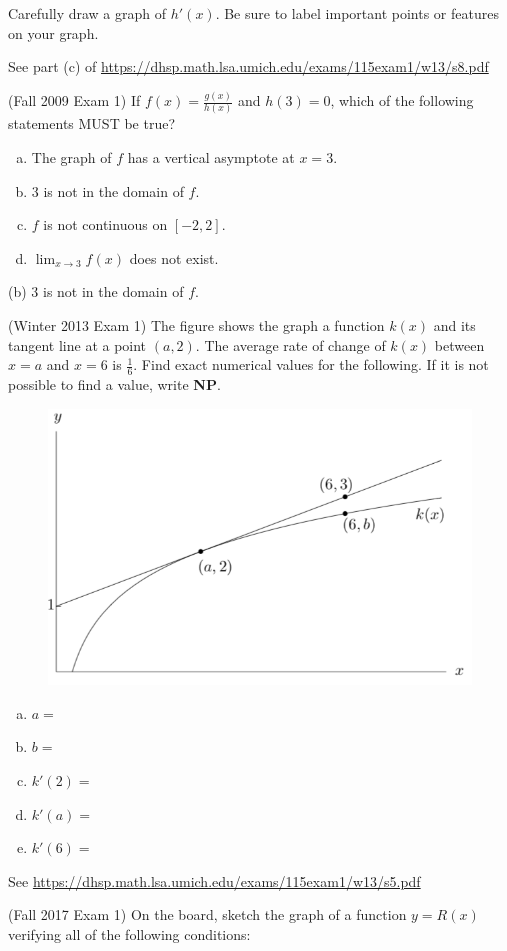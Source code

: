 \documentclass[11pt]{exam}
\begin{document}
\begin{questions}
Carefully draw a graph of $h'(x)$. Be sure to label important points or features on your graph.
\begin{solution}
  See part (c)  of \href{https://dhsp.math.lsa.umich.edu/exams/115exam1/w13/s8.pdf}{https://dhsp.math.lsa.umich.edu/exams/115exam1/w13/s8.pdf}
\end{solution}
\pagebreak
\question (Fall 2009 Exam 1)  If $f(x) = \frac{g(x)}{h(x)}$ and $h(3)=0$, which of the following statements MUST be true?
\begin{enumerate}[(a)]
\item The graph of $f$ has a vertical asymptote at $x=3$.
\item $3$ is not in the domain of $f$.
\item $f$ is not continuous on $[-2,2]$.
\item $\displaystyle\lim_{x \rightarrow 3} f(x)$ does not exist.
\end{enumerate}
\begin{solution}
 (b) \(3\) is not in the domain of \(f\).
\end{solution}
\question (Winter 2013 Exam 1) The figure shows the graph a function $k(x)$ and its tangent line at a point $(a, 2)$. The average rate of change of $k(x)$ between $x = a$ and $x = 6$ is $\frac{1}{6}$.
Find exact numerical values for the following. If it is not possible to find a value, write {\bf NP}.
\begin{figure}[h]
\includegraphics[scale=0.5]{Figures/graphk}
\end{figure}
\begin{multicols}{3}
\begin{enumerate}[(a)]
\item $a =$
\item $b = $
\item $k'(2)=$
\item $k'(a)=$
\item $k'(6)=$
\end{enumerate}
\end{multicols}
\begin{solution}
 See \href{https://dhsp.math.lsa.umich.edu/exams/115exam1/w13/s5.pdf}{https://dhsp.math.lsa.umich.edu/exams/115exam1/w13/s5.pdf}
\end{solution}
\question (Fall 2017 Exam 1) On the board, sketch the graph of a function $y = R(x)$ verifying all of the following conditions:


\end{questions}
\end{document}
